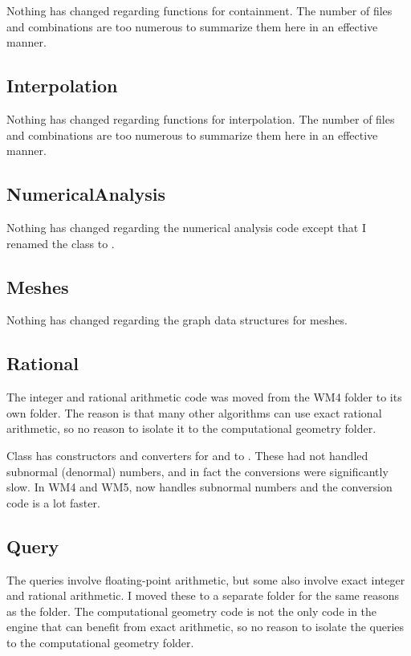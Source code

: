 \documentclass{article}
\begin{document}
Nothing has changed regarding functions for containment.  The
number of files and combinations are too numerous to summarize them here
in an effective manner.

\subsection{Interpolation}

Nothing has changed regarding functions for interpolation.  The
number of files and combinations are too numerous to summarize them here
in an effective manner.

\subsection{NumericalAnalysis}

Nothing has changed regarding the numerical analysis code except that
I renamed the class  to .

\subsection{Meshes}

Nothing has changed regarding the graph data structures for meshes.

\subsection{Rational}

The integer and rational arithmetic code was moved from the WM4
 folder to its own folder.  The reason is
that many other algorithms can use exact rational arithmetic, so no
reason to isolate it to the computational geometry folder.

Class  has constructors and converters for 
and  to .  These had not handled subnormal
(denormal) numbers, and in fact the conversions were significantly slow.
In WM4 and WM5,  now handles subnormal numbers and the
conversion code is a lot faster.

\subsection{Query}

The queries involve floating-point arithmetic, but some also involve
exact integer and rational arithmetic.  I moved these to a separate
folder for the same reasons as the  folder.  The
computational geometry code is not the only code in the engine that
can benefit from exact arithmetic, so no reason to isolate the queries
to the computational geometry folder.
\end{document}
